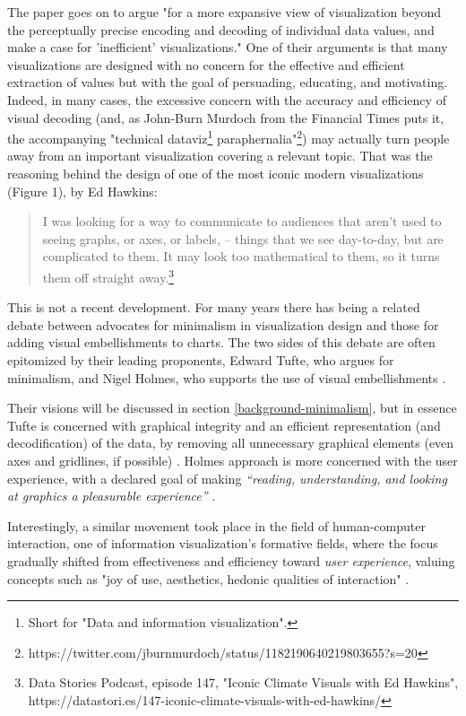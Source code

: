 \documentclass[manuscript, screen]{timtm}
\begin{document}
The paper goes on to argue "for a more expansive view of visualization beyond the perceptually precise encoding and decoding of individual data values, and make a case for 'inefficient' visualizations." One of their arguments is that many visualizations are designed with no concern for the effective and efficient extraction of values but with the goal of persuading, educating, and motivating. Indeed, in many cases, the excessive concern with the accuracy and efficiency of visual decoding (and, as John-Burn Murdoch from the Financial Times puts it, the accompanying "technical dataviz\footnote{Short for "Data and information visualization".} paraphernalia"\footnote{https://twitter.com/jburnmurdoch/status/1182190640219803655?s=20}) may actually turn people away from an important visualization covering a relevant topic. That was the reasoning behind the design of one of the most iconic modern visualizations (Figure 1), by Ed Hawkins:

\begin{quote}
    I was looking for a way to communicate to audiences that aren't used to seeing graphs, or axes, or labels, – things that we see day-to-day, but are complicated to them. It may look too mathematical to them, so it turns them off straight away.\footnote{Data Stories Podcast, episode 147, "Iconic Climate Visuals with Ed Hawkins", https://datastori.es/147-iconic-climate-visuals-with-ed-hawkins/}
\end{quote}

This is not a recent development. For many years there has being a related debate between advocates for minimalism in visualization design and those for adding visual embellishments to charts. The two sides of this debate are often epitomized by their leading proponents, Edward Tufte, who argues for minimalism, and Nigel Holmes, who supports the use of visual embellishments \cite{BatemanScott2010Ujte-useful-junk, BorkinMichelleA.2013WMaV-memorable-vis}.

Their visions will be discussed in section \ref{background-minimalism}, but in essence Tufte is concerned with graphical integrity and an efficient representation (and decodification) of the data, by removing all unnecessary graphical elements (even axes and gridlines, if possible) \cite{tufte2001visual}. Holmes approach is more concerned with the user experience, with a declared goal of making \textit{``reading, understanding, and looking at graphics a pleasurable experience''} \cite{holmes2022joyful}.

Interestingly, a similar movement took place in the field of human-computer interaction, one of information visualization's formative fields, where the focus gradually shifted from effectiveness and efficiency toward \textit{user experience}, valuing concepts such as "joy of use, aesthetics, hedonic qualities of interaction" \cite{emotional-response-WangYun2019AERt}.
\end{document}
